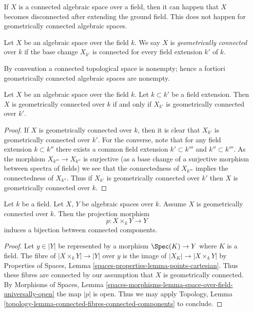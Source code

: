 \noindent
If $X$ is a connected algebraic space over a field, then it can happen that
$X$ becomes disconnected after extending the ground field. This does not
happen for geometrically connected algebraic spaces.

\begin{definition}
\label{definition-geometrically-connected}
Let $X$ be an algebraic space over the field $k$. We say $X$ is
{\it geometrically connected} over $k$ if the base change $X_{k'}$
is connected for every field extension $k'$ of $k$.
\end{definition}

\noindent
By convention a connected topological space is nonempty; hence a fortiori
geometrically connected algebraic spaces are nonempty.

\begin{lemma}
\label{lemma-geometrically-connected-check-after-extension}
Let $X$ be an algebraic space over the field $k$.
Let $k \subset k'$ be a field extension.
Then $X$ is geometrically connected over $k$ if and only if
$X_{k'}$ is geometrically connected over $k'$.
\end{lemma}

\begin{proof}
If $X$ is geometrically connected over $k$, then it is clear that
$X_{k'}$ is geometrically connected over $k'$. For the converse, note
that for any field extension $k \subset k''$ there exists a common
field extension $k' \subset k'''$ and $k'' \subset k'''$. As the
morphism $X_{k'''} \to X_{k''}$ is surjective (as a base change of
a surjective morphism between spectra of fields) we see that the
connectedness of $X_{k'''}$ implies the connectedness of $X_{k''}$.
Thus if $X_{k'}$ is geometrically connected over $k'$ then
$X$ is geometrically connected over $k$.
\end{proof}

\begin{lemma}
\label{lemma-bijection-connected-components}
Let $k$ be a field. Let $X$, $Y$ be algebraic spaces over $k$.
Assume $X$ is geometrically connected over $k$.
Then the projection morphism
$$
p : X \times_k Y \longrightarrow Y
$$
induces a bijection between connected components.
\end{lemma}

\begin{proof}
Let $y \in |Y|$ be represented by a morphism $\Spec(K) \to Y$
where $K$ is a field. The fibre of $|X \times_k Y| \to |Y|$ over $y$
is the image of $|X_K| \to |X \times_k Y|$ by
Properties of Spaces, Lemma \ref{spaces-properties-lemma-points-cartesian}.
Thus these fibres are connected by our assumption that $X$ is
geometrically connected. By
Morphisms of Spaces, Lemma
\ref{spaces-morphisms-lemma-space-over-field-universally-open}
the map $|p|$ is open.
Thus we may apply Topology,
Lemma \ref{topology-lemma-connected-fibres-connected-components}
to conclude.
\end{proof}

